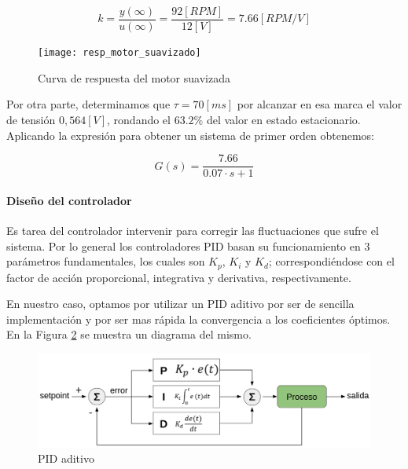 $$ k=\frac{y(\infty)}{u(\infty)}=\frac{92[RPM]}{12[V]}=7.66[RPM/V] $$

\begin{figure}[H]
    \centering
    \texttt{[image: resp\_motor\_suavizado]}
    \caption{Curva de respuesta del motor suavizada}
    \label{fig:curvarespmotorsuaviz}
\end{figure}

Por otra parte, determinamos que $\tau=70[ms]$ por alcanzar en esa marca el valor de tensión $0,564[V]$, rondando el $63.2\%$ del valor en estado estacionario. Aplicando la expresión para obtener un sistema de primer orden obtenemos:

$$ G(s) = \frac{7.66}{0.07 \cdot s + 1} $$


\paragraph{Diseño del controlador} \mbox{} \vspace{8pt}

Es tarea del controlador intervenir para corregir las fluctuaciones que sufre el sistema. Por lo general los controladores PID basan su funcionamiento en 3 parámetros fundamentales, los cuales son $K_p$, $K_i$ y $K_d$; correspondiéndose con el factor de acción proporcional, integrativa y derivativa, respectivamente.

En nuestro caso, optamos por utilizar un PID aditivo por ser de sencilla implementación y por ser mas rápida la convergencia a los coeficientes óptimos. En la Figura \ref{fig:pidaditivo} se muestra un diagrama del mismo.

\begin{figure}[H]
    \centering
    \includegraphics[width=1.0\linewidth]{images/pid_aditivo}
    \caption{PID aditivo}
    \label{fig:pidaditivo}
\end{figure}


